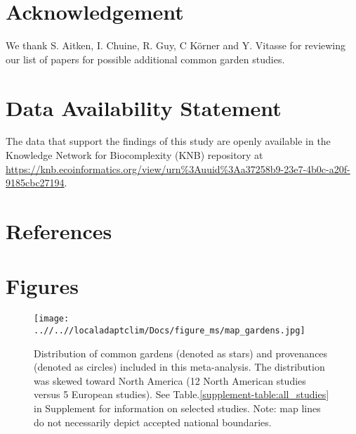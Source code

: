 \documentclass{article}
\begin{document}
 
\section{Acknowledgement}
We thank S. Aitken,  I. Chuine, R. Guy, C K\"{o}rner and Y. Vitasse for reviewing our list of papers for possible additional common garden studies. 

\section{Data Availability Statement}
The data that support the findings of this study are openly available in the Knowledge Network for Biocomplexity (KNB) repository at \url{https://knb.ecoinformatics.org/view/urn\%3Auuid\%3Aa37258b9-23e7-4b0c-a20f-9185cbc27194}.
 
\section{References} %




\clearpage
\section{Figures}
\begin{figure}[!h] 
    \centering
 \texttt{[image: ..//..//localadaptclim/Docs/figure\_ms/map\_gardens.jpg]}
    \caption{Distribution of common gardens (denoted as stars) and provenances (denoted as circles) included in this meta-analysis. The distribution was skewed toward North America (12 North American studies versus 5 European studies). See Table.\ref{supplement-table:all_studies} in Supplement for information on selected studies. Note: map lines do not necessarily depict accepted national boundaries.}
    \label{figure:map_gardens}
\end{figure}
\end{document}
